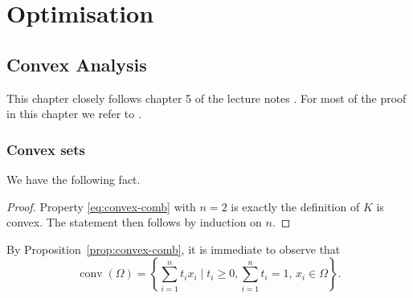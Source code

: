 \documentclass{report}
\begin{document}
	
	\thispagestyle{empty}
	\newpage%
	\tableofcontents
	
	\part{Optimisation}
	\chapter{Convex Analysis}

	This chapter closely follows chapter 5 of the lecture notes \cite{fornasierFoundations}.
	For most of the proof in this chapter we refer to \cite{rockafellarConvex2015}.

	\section{Convex sets}


	We have the following fact.


	 \begin{proof}
		Property \eqref{eq:convex-comb} with $n=2$ is exactly the definition of $K$ is convex. The statement then follows by induction on $n$. 
	 \end{proof}


	By Proposition~\ref{prop:convex-comb}, it is immediate to observe that 
	\begin{equation}
		\operatorname{conv}(\Omega) = \left\{ \sum_{i=1}^n t_i x_i \mid t_i\ge 0, \sum_{i=1}^n t_i = 1,\, x_i \in \Omega \right\}.
	\end{equation}
\end{document}
